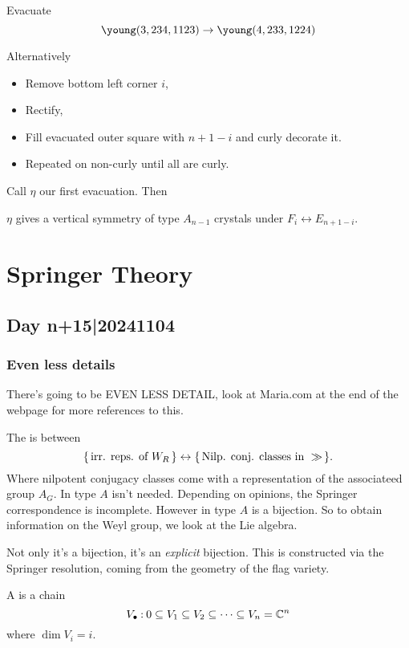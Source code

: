 \documentclass[12pt]{memoir}
\begin{document}
\begin{Ex}
    Evacuate 
    $$\young(3,234,1123)\to\young(4,233,1224)$$
\end{Ex}

Alternatively
\begin{itemize}
    \item Remove bottom left corner $i$,
    \item Rectify,
    \item Fill evacuated outer square with $n+1-i$ and curly decorate it.
    \item Repeated on non-curly until all are curly.
\end{itemize}

Call $\eta$ our first evacuation. Then

\begin{Prop}
\end{Prop}
$\eta$ gives a vertical symmetry of type $A_{n-1}$ crystals under $F_i\leftrightarrow E_{n+1-i}$.

\chapter{Springer Theory}
\section{Day n+15|20241104}
\subsection{Even less details}

There's going to be EVEN LESS DETAIL, look at Maria.com at the end of the webpage for more references to this.\par
The  is between 
$$\{\,\text{irr. reps. of }W_R\,\}\leftrightarrow\{\,\text{Nilp. conj. classes in }\gg\,\}.$$
Where nilpotent conjugacy classes come with a representation of the associateed group $A_G$. In type $A$ isn't needed. Depending on opinions, the Springer correspondence is incomplete. However in type $A$ is a bijection. So to obtain information on the Weyl group, we look at the Lie algebra.\par
Not only it's a bijection, it's an \emph{explicit} bijection. This is constructed via the Springer resolution, coming from the geometry of the flag variety.

\begin{Def}
    A  is a chain 
    $$V_\bullet\mathbin{:} 0\subseteq V_1\subseteq V_2\subseteq\dots\subseteq V_n=\mathbb{C}^n$$ 
    where $\dim V_i=i$.
\end{Def}
\end{document}
